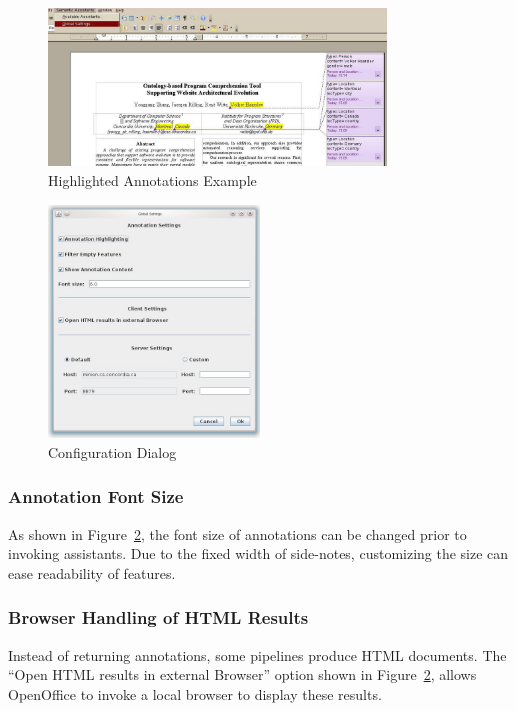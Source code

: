 \begin{figure}
  \centering
  \includegraphics[width=0.8\textwidth]{pictures/highlighting.jpg}
  \caption{Highlighted Annotations Example}
  \label{fig:highlight}
\end{figure}

\begin{figure}[htb]
\begin{center}
  \includegraphics[width=0.5\textwidth]{pictures/oosettings.jpg}
  \caption{Configuration Dialog}
  \label{fig:oosettings}
\end{center}
\end{figure}

\subsubsection{Annotation Font Size}
As shown in Figure~\ref{fig:oosettings}, the font size of annotations can be changed
prior to invoking assistants. Due to the fixed width of side-notes, customizing the
size can ease readability of features.

\subsubsection{Browser Handling of HTML Results}
Instead of returning annotations, some pipelines produce HTML documents. The
``Open HTML results in external Browser'' option shown in Figure~\ref{fig:oosettings},
allows OpenOffice to invoke a local browser to display these results.

